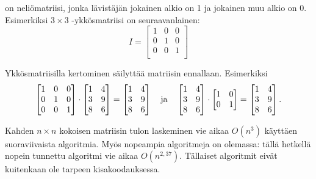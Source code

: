 
 on neliömatriisi,
jonka lävistäjän jokainen alkio on 1
ja jokainen muu alkio on 0.
Esimerkiksi $3 \times 3$ -ykkösmatriisi on
seuraavanlainen:
\[
 I = \begin{bmatrix}
  1 & 0 & 0 \\
  0 & 1 & 0 \\
  0 & 0 & 1 \\
 \end{bmatrix}
\]

\begin{samepage}
Ykkösmatriisilla kertominen säilyttää matriisin
ennallaan. Esimerkiksi
\[
 \begin{bmatrix}
  1 & 0 & 0 \\
  0 & 1 & 0 \\
  0 & 0 & 1 \\
 \end{bmatrix}
\cdot
 \begin{bmatrix}
  1 & 4 \\
  3 & 9 \\
  8 & 6 \\
 \end{bmatrix}
=
 \begin{bmatrix}
  1 & 4 \\
  3 & 9 \\
  8 & 6 \\
 \end{bmatrix} \hspace{10px} \textrm{ja} \hspace{10px}
 \begin{bmatrix}
  1 & 4 \\
  3 & 9 \\
  8 & 6 \\
 \end{bmatrix}
\cdot
 \begin{bmatrix}
  1 & 0 \\
  0 & 1 \\
 \end{bmatrix}
=
 \begin{bmatrix}
  1 & 4 \\
  3 & 9 \\
  8 & 6 \\
 \end{bmatrix}.
\]
\end{samepage}

Kahden $n \times n$ kokoisen matriisin tulon
laskeminen vie aikaa $O(n^3)$
käyttäen suoraviivaista algoritmia.
Myös nopeampia algoritmeja on olemassa:
tällä hetkellä nopein tunnettu algoritmi
vie aikaa $O(n^{2{,}37})$.
Tällaiset algoritmit eivät kuitenkaan
ole tarpeen kisakoodauksessa.

